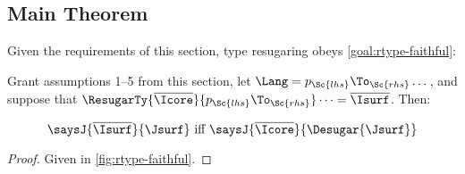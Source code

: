 \subsection{Main Theorem}

Given the requirements of this section, type resugaring obeys
\cref{goal:rtype-faithful}:
\begin{theorem} \label{thm:rtype-faithful}
  Grant assumptions 1--5 from this section,
  let $\Lang = p_\Sc{lhs}\To_\Sc{rhs}\dots$,
  and suppose that \newline
  $\ResugarTy{\overline{\Icore}}{p_\Sc{lhs}\To_\Sc{rhs}}\dots = \overline{\Isurf}$. Then:

  \[\saysJ{\overline{\Isurf}}{\Jsurf} \text{ iff }
  \saysJ{\overline{\Icore}}{\Desugar{\Jsurf}} \]
\end{theorem}
\begin{proof}
  Given in \cref{fig:rtype-faithful}.
\end{proof}
